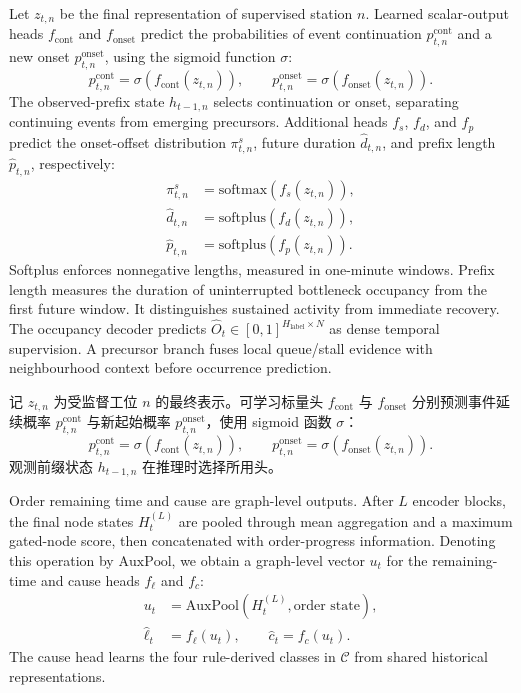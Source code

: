 \documentclass[a4paper,fleqn]{cas-dc}
\newcommand{\zhpara}[1]{%
  \par\begingroup\small\color{black!72}\noindent #1\par\endgroup}
\begin{document}
Let $z_{t,n}$ be the final representation of supervised station $n$. Learned scalar-output heads $f_{\mathrm{cont}}$ and $f_{\mathrm{onset}}$ predict the probabilities of event continuation $p^{\mathrm{cont}}_{t,n}$ and a new onset $p^{\mathrm{onset}}_{t,n}$, using the sigmoid function $\sigma$:
\begin{equation}
p^{\mathrm{cont}}_{t,n}=\sigma(f_{\mathrm{cont}}(z_{t,n})),
\qquad
p^{\mathrm{onset}}_{t,n}=\sigma(f_{\mathrm{onset}}(z_{t,n})).
\end{equation}
The observed-prefix state $h_{t-1,n}$ selects continuation or onset, separating continuing events from emerging precursors. Additional heads $f_s$, $f_d$, and $f_p$ predict the onset-offset distribution $\pi^s_{t,n}$, future duration $\hat d_{t,n}$, and prefix length $\hat p_{t,n}$, respectively:
\begin{equation}
\begin{aligned}
\pi^s_{t,n}&=\mathrm{softmax}(f_s(z_{t,n})),\\
\hat d_{t,n}&=\mathrm{softplus}(f_d(z_{t,n})),\\
\hat p_{t,n}&=\mathrm{softplus}(f_p(z_{t,n})).
\end{aligned}
\end{equation}
Softplus enforces nonnegative lengths, measured in one-minute windows. Prefix length measures the duration of uninterrupted bottleneck occupancy from the first future window. It distinguishes sustained activity from immediate recovery.
The occupancy decoder predicts $\hat O_t\in[0,1]^{H_{\mathrm{label}}\times N}$ as dense temporal supervision. A precursor branch fuses local queue/stall evidence with neighbourhood context before occurrence prediction.

\zhpara{记 $z_{t,n}$ 为受监督工位 $n$ 的最终表示。可学习标量头 $f_{\mathrm{cont}}$ 与 $f_{\mathrm{onset}}$ 分别预测事件延续概率 $p^{\mathrm{cont}}_{t,n}$ 与新起始概率 $p^{\mathrm{onset}}_{t,n}$，使用 sigmoid 函数 $\sigma$：
\begin{equation}
p^{\mathrm{cont}}_{t,n}=\sigma(f_{\mathrm{cont}}(z_{t,n})),
\qquad
p^{\mathrm{onset}}_{t,n}=\sigma(f_{\mathrm{onset}}(z_{t,n})).
\end{equation}
观测前缀状态 $h_{t-1,n}$ 在推理时选择所用头。}


Order remaining time and cause are graph-level outputs. After $L$ encoder blocks, the final node states $H_t^{(L)}$ are pooled through mean aggregation and a maximum gated-node score, then concatenated with order-progress information. Denoting this operation by $\mathrm{AuxPool}$, we obtain a graph-level vector $u_t$ for the remaining-time and cause heads $f_\ell$ and $f_c$:
\begin{equation}
\begin{aligned}
u_t&=\mathrm{AuxPool}(H_t^{(L)},\text{order state}),\\
\hat\ell_t&=f_\ell(u_t),\qquad \hat c_t=f_c(u_t).
\end{aligned}
\end{equation}
The cause head learns the four rule-derived classes in $\mathcal{C}$ from shared historical representations.
\end{document}
